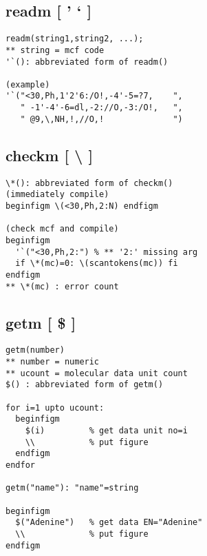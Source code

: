 \documentclass[a4paper]{article}
\begin{document}
\subsection{readm [ ' ` ]}
%
%
\begin{verbatim}
readm(string1,string2, ...);
** string = mcf code
'`(): abbreviated form of readm()

(example)
'`("<30,Ph,1'2'6:/O!,-4'-5=?7,    ",
   " -1'-4'-6=dl,-2://O,-3:/O!,   ",
   " @9,\,NH,!,//O,!              ")
\end{verbatim}
\subsection{checkm [ \textbackslash*{ }]}
%
\index{\textbackslash*()}%
\begin{verbatim}
\*(): abbreviated form of checkm()
(immediately compile)
beginfigm \(<30,Ph,2:N) endfigm

(check mcf and compile)
beginfigm
  '`("<30,Ph,2:") % ** '2:' missing arg
  if \*(mc)=0: \(scantokens(mc)) fi
endfigm
** \*(mc) : error count
\end{verbatim}
\quad
{}
\subsection{getm [ \$ ]}
%
%
\index{\$}%
\begin{verbatim}
getm(number)
** number = numeric
** ucount = molecular data unit count
$() : abbreviated form of getm()

for i=1 upto ucount:
  beginfigm
    $(i)         % get data unit no=i
    \\           % put figure
  endfigm
endfor

getm("name"): "name"=string

beginfigm
  $("Adenine")   % get data EN="Adenine"
  \\             % put figure
endfigm
\end{verbatim}
\end{document}
